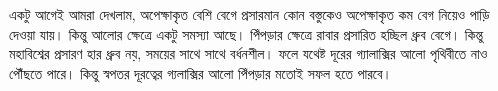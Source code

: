 \documentclass[
]{book}
\begin{document}
একটু আগেই আমরা দেখলাম, অপেক্ষাকৃত বেশি বেগে প্রসারমান কোন বস্তুকেও অপেক্ষাকৃত কম বেগ নিয়েও পাড়ি দেওয়া যায়। কিন্তু আলোর ক্ষেত্রে একটু সমস্যা আছে। পিঁপড়ার ক্ষেত্রে রাবার প্রসারিত হচ্ছিল ধ্রুব বেগে। কিন্তু মহাবিশ্বের প্রসারণ হার ধ্রুব নয়, সময়ের সাথে সাথে বর্ধনশীল। ফলে যথেষ্ট দূরের গ্যালাক্সির আলো পৃথিবীতে নাও পৌঁছতে পারে। কিন্তু স্বপতর দূরত্বের গ্যলাক্সির আলো পিঁপড়ার মতোই সফল হতে পারবে।

  
\end{document}
